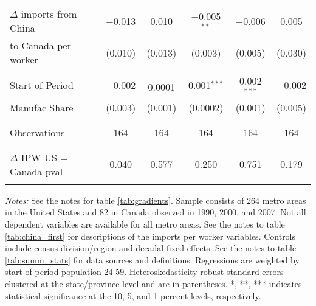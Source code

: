 \begin{sidewaystable}[!htbp]
\begin{threeparttable}
\begin{tabular}{@{\extracolsep{5pt}}lccccc}
 $\Delta$ imports from China & $-$0.013 & 0.010 & $-$0.005$^{**}$ & $-$0.006 & 0.005 \\ 
to Canada per worker  & (0.010) & (0.013) & (0.003) & (0.005) & (0.030) \\ 
  & & & & & \\ 
 Start of Period & $-$0.002 & $-$0.0001 & 0.001$^{***}$ & 0.002$^{***}$ & $-$0.002 \\ 
Manufac Share  & (0.003) & (0.001) & (0.0002) & (0.001) & (0.005) \\ 
  & & & & & \\ 
\cline{2-6} \\[-2.0ex]
Observations & 164 & 164 & 164 & 164 & 164 \\ 
\\[-2.0ex]
\hline \\[-2.0ex]
$\Delta$ IPW US = Canada pval & 0.040 & 0.577 & 0.250 & 0.751 & 0.179 \\
\hline 
\hline \\[-1.8ex] 
\end{tabular} 
\begin{tablenotes}
\footnotesize
\item \textit{Notes:} See the notes for table \ref{tab:gradients}. Sample consists of 264 metro areas in the United States and 82 in Canada observed  in  1990, 2000, and 2007. Not all dependent variables are available for all metro areas. See the notes to table \ref{tab:china_first} for descriptions of the imports per worker variables. Controls include census division/region and decadal fixed effects. See the notes to table \ref{tab:summ_stats} for data sources and definitions. Regressions are  weighted by start of period population 24-59. Heteroskedasticity robust standard errors clustered at the state/province level and are in parentheses. *, **, *** indicates statistical significance at the 10, 5, and 1 percent levels, respectively.
\end{tablenotes}
\end{threeparttable}
\end{sidewaystable} 



